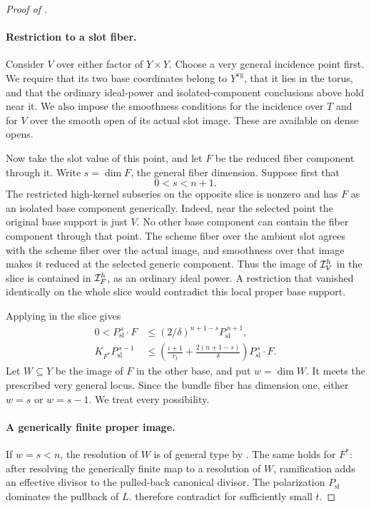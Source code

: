 \begin{proof}[Proof of ]
\paragraph{Restriction to a slot fiber.}
Consider \(V\) over either factor of \(Y\times Y\). Choose a very
general incidence point first. We require that its two base
coordinates belong to \(Y^{\mathrm{vg}}\), that it lies in the torus,
and that the ordinary ideal-power and isolated-component conclusions
above hold near it. We also impose the smoothness conditions for
the incidence over \(T\) and for \(V\) over the smooth open of its
actual slot image. These are available on dense opens.

Now take the slot value of this point, and let \(F\) be the reduced
fiber component through it. Write \(s=\dim F\), the general fiber
dimension. Suppose first that
\[
 0<s<n+1.
\]
The restricted high-kernel subseries on the opposite slice is
nonzero and has \(F\) as an isolated base component generically.
Indeed, near the selected point the original base support is just
\(V\). No other base component can contain the fiber component
through that point. The scheme fiber over the ambient slot agrees
with the scheme fiber over the actual image, and smoothness over
that image makes it reduced at the selected generic component.
Thus the image of \(\mathcal I_V^h\) in the slice is contained in
\(\mathcal I_F^h\), as an ordinary ideal power. A restriction that vanished
identically on the whole slice would contradict this local proper
base support.

Applying  in the slice gives
\begin{align}
 0<P_{\mathrm{sl}}^{\,s}\cdot F
 &\le(2/\delta)^{n+1-s}P_{\mathrm{sl}}^{\,n+1},
 \label{eq:two-slot-fiber-volume}\\
 K_{F^*}P_{\mathrm{sl}}^{\,s-1}
 &\le
 \left(\frac{\iota+1}{r_t}+\frac{2(n+1-s)}{\delta}\right)
 P_{\mathrm{sl}}^{\,s}\cdot F .
 \label{eq:two-slot-fiber-canonical}
\end{align}
Let \(W\subseteq Y\) be the image of \(F\) in the other base, and put
\(w=\dim W\). It meets the prescribed very general locus. Since the
bundle fiber has dimension one, either \(w=s\) or \(w=s-1\).
We treat every possibility.

\paragraph{A generically finite proper image.}
If \(w=s<n\), the resolution of \(W\) is of general type by
. The same holds for \(F^*\): after resolving
the generically finite map to a resolution of \(W\), ramification
adds an effective divisor to the pulled-back canonical divisor.
The polarization \(P_{\mathrm{sl}}\) dominates the pullback of \(L\).
 therefore contradict
 for sufficiently small \(t\).


\end{proof}
